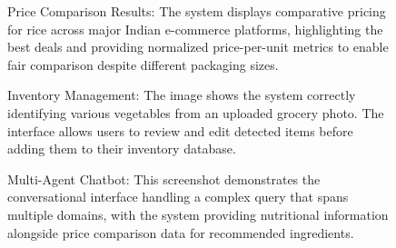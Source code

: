 \documentclass{ecai}
\begin{document}
\begin{figure}[h]
\centering
{}
\caption{Price Comparison Results: The system displays comparative pricing for rice across major Indian e-commerce platforms, highlighting the best deals and providing normalized price-per-unit metrics to enable fair comparison despite different packaging sizes.}
\end{figure}

\begin{figure}[h]
\centering
{}
\caption{Inventory Management: The image shows the system correctly identifying various vegetables from an uploaded grocery photo. The interface allows users to review and edit detected items before adding them to their inventory database.}
\end{figure}

\begin{figure}[h]
\centering
{}
\caption{Multi-Agent Chatbot: This screenshot demonstrates the conversational interface handling a complex query that spans multiple domains, with the system providing nutritional information alongside price comparison data for recommended ingredients.}
\end{figure}
\end{document}
